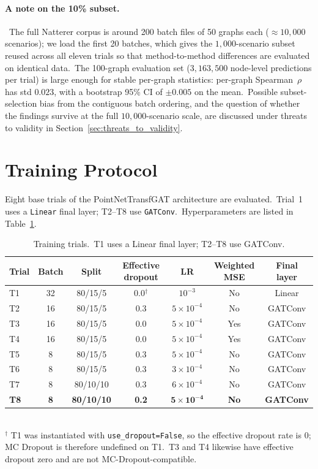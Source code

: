 \paragraph{A note on the 10\% subset.}\ The full Natterer corpus is around 200 batch files of 50 graphs each ($\approx 10{,}000$ scenarios); we load the first 20 batches, which gives the $1{,}000$-scenario subset reused across all eleven trials so that method-to-method differences are evaluated on identical data.\ The 100-graph evaluation set ($3{,}163{,}500$ node-level predictions per trial) is large enough for stable per-graph statistics: per-graph Spearman~$\rho$ has std $0.023$, with a bootstrap 95\% CI of $\pm 0.005$ on the mean.\ Possible subset-selection bias from the contiguous batch ordering, and the question of whether the findings survive at the full $10{,}000$-scenario scale, are discussed under threats to validity in Section~\ref{sec:threats_to_validity}.

\section{Training Protocol}\label{sec:training_protocol}

Eight base trials of the PointNetTransfGAT architecture are evaluated.\ Trial~1 uses a \texttt{Linear} final layer; T2--T8 use \texttt{GATConv}.\ Hyperparameters are listed in Table~\ref{tab:trials}.

\begin{table}[htbp]
 \centering
 \caption[Training trials and hyperparameters]{Training trials.\ T1 uses a Linear final layer; T2--T8 use GATConv.}
 \label{tab:trials}
 \begin{tabular}{lcccccc}
 \toprule
 Trial & Batch & Split & Effective dropout & LR & Weighted MSE & Final layer \\
 \midrule
 T1 & 32 & 80/15/5 & 0.0$^\dagger$ & $10^{-3}$ & No & Linear \\
 T2 & 16 & 80/15/5 & 0.3 & $5 \times 10^{-4}$ & No & GATConv \\
 T3 & 16 & 80/15/5 & 0.0 & $5 \times 10^{-4}$ & Yes & GATConv \\
 T4 & 16 & 80/15/5 & 0.0 & $5 \times 10^{-4}$ & Yes & GATConv \\
 T5 & 8 & 80/15/5 & 0.3 & $5 \times 10^{-4}$ & No & GATConv \\
 T6 & 8 & 80/15/5 & 0.3 & $3 \times 10^{-4}$ & No & GATConv \\
 T7 & 8 & 80/10/10 & 0.3 & $6 \times 10^{-4}$ & No & GATConv \\
 \textbf{T8} & \textbf{8} & \textbf{80/10/10} & \textbf{0.2} & $\mathbf{5 \times 10^{-4}}$ & \textbf{No} & \textbf{GATConv} \\
 \bottomrule
 \end{tabular}
 \\[2pt]
 \footnotesize $^\dagger$ T1 was instantiated with \texttt{use\_dropout=False}, so the effective dropout rate is $0$; MC Dropout is therefore undefined on T1.\ T3 and T4 likewise have effective dropout zero and are not MC-Dropout-compatible.
\end{table}

